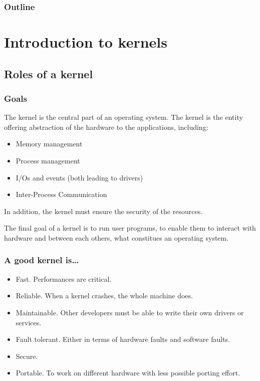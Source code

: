 %
%

\begin{frame}
  \frametitle{Outline}
  \tableofcontents
\end{frame}

%
%

\section{Introduction to kernels}

%
%

\subsection{Roles of a kernel}


\begin{frame}
  \frametitle{Goals}

  The kernel is the central part of an operating system. The kernel is
  the entity offering abstraction of the hardware to the applications,
  including:

  \begin{itemize}
  \item
    Memory management
  \item
    Process management
  \item
    I/Os and events (both leading to drivers)
  \item
    Inter-Process Communication
  \end{itemize}

  In addition, the kernel must ensure the security of the resources.

  \-

  The final goal of a kernel is to run user programs, to enable them
  to interact with hardware and between each others, what constitues
  an operating system.

\end{frame}


\begin{frame}
  \frametitle{A good kernel is\ldots}

  \begin{itemize}
  \item
    Fast. Performances are critical.
  \item
    Reliable. When a kernel crashes, the whole machine does.
  \item
    Maintainable. Other developers must be able to write their own
    drivers or services.
  \item
    Fault tolerant. Either in terms of hardware faults and software
    faults.
  \item
    Secure.
  \item
    Portable. To work on different hardware with less possible porting
    effort.
  \end{itemize}

\end{frame}

